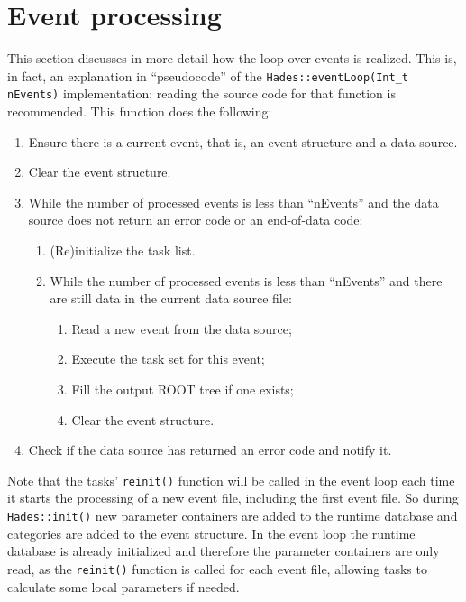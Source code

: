 \section{Event processing}

This section discusses in more detail how the loop over events is realized. This is, in 
fact, an explanation in ``pseudocode'' of the \verb+Hades::eventLoop(Int_t nEvents)+ 
implementation: reading the source code for that function is recommended. This function 
does the following:
\begin{enumerate}
 \item Ensure there is a current event, that is, an event structure and a data source. 
 \item Clear the event structure. 
 \item While the number of processed events is less than ``nEvents'' and the data 
 source does not return an error code or an end-of-data code:
      \begin{enumerate}
         \item (Re)initialize the task list. 
         \item While the number of processed events is less than ``nEvents'' and 
         there are still data in the current data source file:

            \begin{enumerate}
              \item Read a new event from the data source; 
              \item Execute the task set for this event; 
              \item Fill the output ROOT tree if one exists; 
              \item Clear the event structure. 
            \end{enumerate}
      \end{enumerate}
 \item Check if the data source has returned an error code and notify it. 

\end{enumerate}


Note that the tasks' \verb+reinit()+ function will be called in the event loop each 
time it starts the processing of a new event file, including the first event file. 
So during \verb+Hades::init()+ new parameter containers are added to the runtime 
database and categories are added to the event structure. In the event loop the 
runtime database is already initialized and therefore the parameter containers 
are only read, as the \verb+reinit()+ function is called for each event file, 
allowing tasks to calculate some local parameters if needed.


